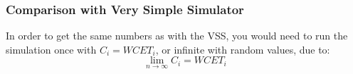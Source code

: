 \subsubsection{Comparison with Very Simple Simulator}
In order to get the same numbers as with the VSS, you would need to run the simulation once with $C_i=WCET_i$, or infinite with random values, due to:
\begin{equation}
\underset{n\rightarrow \infty }{\lim}C_i=WCET_i\end{equation}
